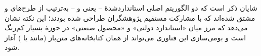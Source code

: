 شایان ذکر است که دو الگوریتم اصلی استانداردشدهٔ  -- یعنی  و  -- به‌ترتیب از طرح‌های  و  مشتق شده‌اند که با مشارکت مستقیم پژوهشگران  طراحی شده بودند؛ این نکته نشان می‌دهد که مرز میان «استاندارد دولتی» و «محصول صنعتی» در حوزهٔ  بسیار کم‌رنگ است و بومی‌سازی این فناوری می‌تواند از همان کتابخانه‌های متن‌باز (مانند  یا ) آغاز شود.


